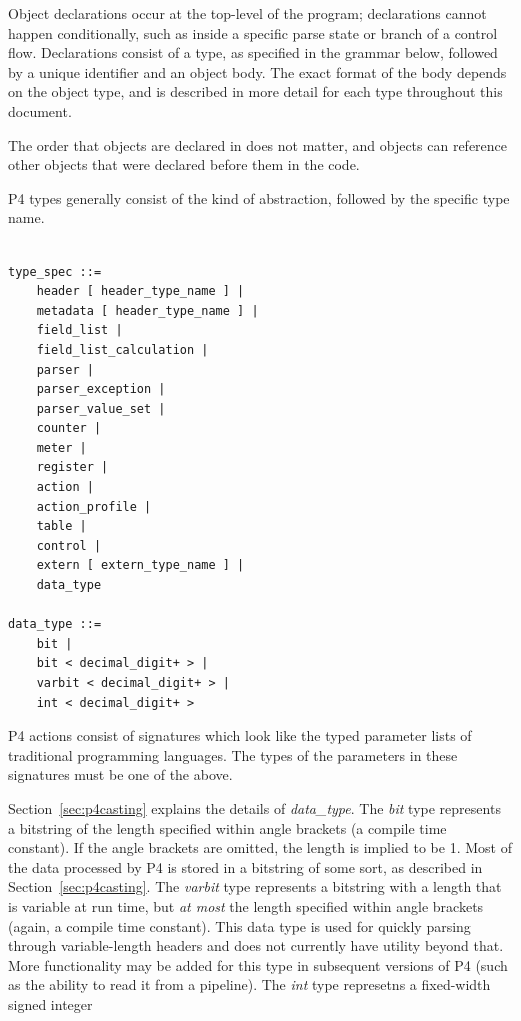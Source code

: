 \documentclass[12pt]{article}
\begin{document}
Object declarations occur at the top-level of the program; declarations cannot 
happen conditionally, such as inside a specific parse state or branch of a 
control flow. Declarations consist of a type, as specified in the grammar below, 
followed by a unique identifier and an object body. The exact format of the 
body depends on the object type, and is described in more detail for each type 
throughout this document.

The order that objects are declared in does not matter, and objects can
reference other objects that were declared before them in the code.

P4 types generally consist of the kind of abstraction, followed by the specific
type name.


\begin{lstlisting}[style=BNFstyle]

type_spec ::=
    header [ header_type_name ] |
    metadata [ header_type_name ] |
    field_list |
    field_list_calculation |
    parser |
    parser_exception |
    parser_value_set |
    counter |
    meter |
    register |
    action |
    action_profile |
    table |
    control |
    extern [ extern_type_name ] |
    data_type

data_type ::=
    bit |
    bit < decimal_digit+ > |
    varbit < decimal_digit+ > |
    int < decimal_digit+ >
\end{lstlisting}

P4 actions consist of signatures which look like the typed
parameter lists of traditional programming languages. The types of the
parameters in these signatures must be one of the above.

Section~\ref{sec:p4casting} explains the details of \textit{data_type}.
The \textit{bit} type represents a bitstring of the length specified within
angle brackets (a compile time constant). If the angle brackets are omitted, the
length is implied to be 1. Most of the data processed by P4 is stored in a
bitstring of some sort, as described in Section~\ref{sec:p4casting}.
The \textit{varbit} type represents a bitstring with a length that is variable
at run time, but \textit{at most} the length specified within angle brackets
(again, a compile time constant). This data type is used for quickly parsing
through variable-length headers and does not currently have utility beyond
that. More functionality may be added for this type in subsequent versions of P4
(such as the ability to read it from a \matchaction pipeline).
The \textit{int} type represetns a fixed-width signed integer
\end{document}
